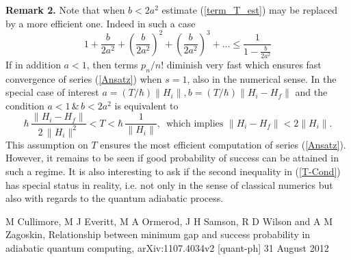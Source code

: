 \documentclass[11 pt]{article}
\begin{document}
\noindent
\textbf{Remark 2.} Note that when $b < 2a^2$ estimate (\ref{term_T_est}) may be replaced by a more efficient one. Indeed in such a case
\[
1 + \frac{b}{2a^2} + \left(\frac{b}{2a^2}\right)^2  + \left(\frac{b}{2a^2}\right)^3 +\ldots  \leq \frac{1}{1-\frac{b}{2a^2}}
\]
If in addition $a<1$, then terms $p_n/n!$ diminish very fast which ensures fast convergence of series (\ref{Ansatz}) when $s=1$, also in the numerical sense. In the special case of interest $a  = (T/\hbar)\|H_i\|, b =  (T/\hbar)\|H_i-H_f\|$ and the condition $a<1\,\& \, b< 2a^2$ is equivalent to
\begin{equation}\label{T-Cond}
\hbar \,\frac{\|H_i-H_f\|}{2\,\|H_i\|^2} < T < \hbar\, \frac{1}{\|H_i\|},\, \mbox{ which implies }
\|H_i-H_f\| < 2\|H_i\|.
\end{equation}
This assumption on $T$ ensures the most efficient computation of series (\ref{Ansatz}). However, it remains to be seen if good probability of success can be attained in such a regime.  It is also interesting to ask if the second inequality in (\ref{T-Cond}) has special status in reality, i.e. not only in the sense of classical numerics but also with regards to the quantum adiabatic process. 
 
 
 
 

\newpage
\begin{thebibliography}{[90]}

 M Cullimore, M J Everitt, M A Ormerod, J H Samson,
R D Wilson and A M Zagoskin, Relationship between minimum gap and success
probability in adiabatic quantum computing, arXiv:1107.4034v2 [quant-ph] 31 August 2012

\end{thebibliography}
\end{document}
